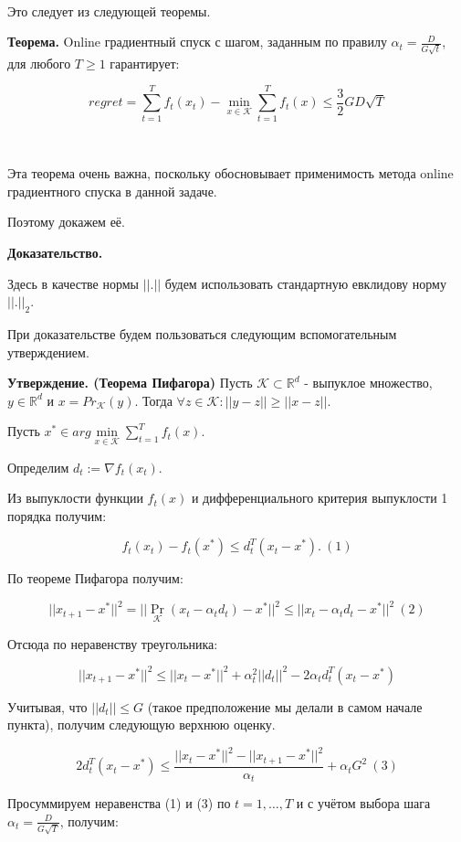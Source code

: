\documentclass[12pt]{article}
\theoremstyle{definition}
\begin{document}
$ $

Это следует из следующей теоремы.

\textbf{Теорема.} Online градиентный спуск с шагом, заданным по правилу $\alpha_t = \frac{D}{G\sqrt{t}}$, для любого $T \geq 1$ гарантирует:

$$regret = \sum\limits_{t=1}^T f_t(x_t) - \min\limits_{x\in \mathcal{K}} \sum\limits_{t=1}^T f_t(x) \leq \frac{3}{2}GD\sqrt{T}$$

$ $

Эта теорема очень важна, поскольку обосновывает применимость метода online градиентного спуска в данной задаче.

Поэтому докажем её.

\textbf{Доказательство.}

Здесь в качестве нормы $||.||$ будем использовать стандартную евклидову норму $||.||_2$.

При доказательстве будем пользоваться следующим вспомогательным утверждением.

\textbf{Утверждение. (Теорема Пифагора)} Пусть $\mathcal{K} \subset \mathbb{R}^d$ - выпуклое множество, $y \in \mathbb{R}^d$ и $x=Pr_{\mathcal{K}}(y)$. Тогда $\forall z \in \mathcal{K}: ||y-z|| \geq ||x-z||$.

Пусть $x^* \in arg \min\limits_{x \in \mathcal{K}} \sum\limits_{t=1}^T f_t(x)$.

Определим $d_t := \nabla f_t(x_t)$.

Из выпуклости функции $f_t(x)$ и дифференциального критерия выпуклости 1 порядка получим:

$$f_t(x_t) - f_t(x^*) \leq d_t^T (x_t-x^*).\ (1)$$

По теореме Пифагора получим:

$$||x_{t+1}-x^*||^2 = ||\Pr_{\mathcal{K}}(x_t - \alpha_td_t) -x^*||^2 \leq ||x_t-\alpha_t d_t-x^*||^2\ (2)$$

Отсюда по неравенству треугольника:

$$||x_{t+1}-x^*||^2 \leq ||x_t-x^*||^2 + \alpha_t^2||d_t||^2 - 2\alpha_td_t^T(x_t-x^*)$$

Учитывая, что $||d_t|| \leq G$ (такое предположение мы делали в самом начале пункта), получим следующую верхнюю оценку.

$$2d_t^T(x_t-x^*) \leq \frac{||x_t-x^*||^2 - ||x_{t+1}-x^*||^2}{\alpha_t} + \alpha_t G^2\ (3)$$ 

Просуммируем неравенства (1) и (3) по $t=1, \dots, T$ и с учётом выбора шага $\alpha_t = \frac{D}{G\sqrt{T}}$, получим:
\end{document}
